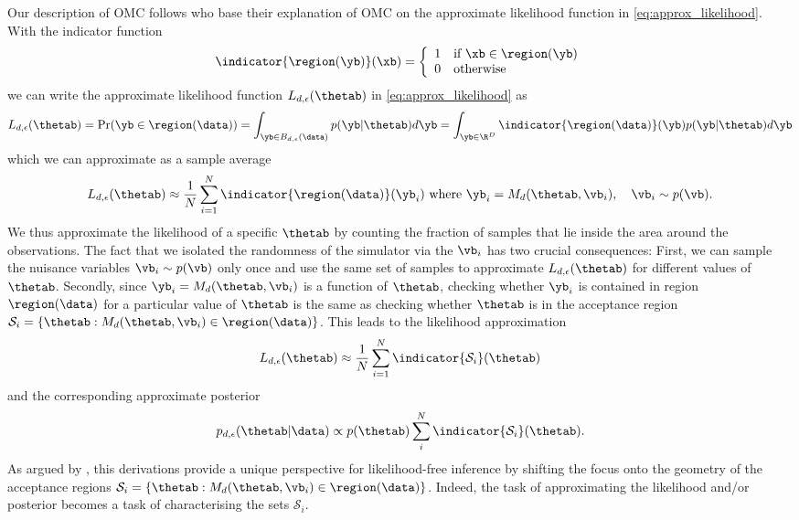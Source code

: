 Our description of OMC \citep{Meeds2015}
follows \citet{Ikonomov2019} who base their explanation of OMC on the
approximate likelihood function in \eqref{eq:approx_likelihood}. With
the indicator function
%
\begin{equation} \label{eq:indicator} \indicator{\region(\yb)}(\xb)=
  \left\{
    \begin{array}{ll}
      1 & \mbox{if } \xb \in \region(\yb) \\
      0 & \mbox{otherwise} 
    \end{array} \right. \end{equation}
%
we can write the approximate likelihood function $L_{d, \epsilon}(\thetab)$ in \eqref{eq:approx_likelihood} as
\begin{gather} \label{eq:approx_likelihood_omc}
  L_{d, \epsilon}(\thetab) = \Pr(\yb \in \region(\data)) =
  \int_{\yb \in B_{d,\epsilon}(\data)}p(\yb|\thetab)d\yb =
  \int_{\yb \in \R^D} \indicator{\region(\data)}(\yb)p(\yb|\thetab)d\yb
\end{gather}
which we can approximate as a sample average
\begin{equation}
L_{d, \epsilon}(\thetab) \approx \frac{1}{N} \sum_{i=1}^N \indicator{\region (\data)} (\yb_i)
  \text{ where } \yb_i = M_d(\thetab, \vb_i), \quad \vb_i \sim p(\vb). \label{eq:alt_view}
\end{equation}
We thus approximate the likelihood of a specific $\thetab$ by counting
the fraction of samples that lie inside the area around the
observations. The fact that we isolated the randomness of the
simulator via the $\vb_i$ has two crucial consequences: First, we can
sample the nuisance variables $\vb_i \sim p(\vb)$ only once and use
the same set of samples to approximate $L_{d,\epsilon}(\thetab)$ for
different values of $\thetab$. Secondly, since
$\yb_i=M_d(\thetab, \vb_i)$ is a function of $\thetab$, checking
whether $\yb_i$ is contained in region $\region (\data)$ for a
particular value of $\thetab$ is the same as checking whether
$\thetab$ is in the acceptance region $\mathcal{S}_i = \{ \thetab:
M_d(\thetab, \vb_i) \in \region(\data) \}$. This leads to the
likelihood approximation
\begin{equation}
L_{d, \epsilon}(\thetab) \approx \frac{1}{N} \sum_{i=1}^N \indicator{\mathcal{S}_i}(\thetab) \label{eq:alt_view_theta}
\end{equation}
and the corresponding approximate posterior
\begin{equation} \label{eq:approx_posterior_omc}
  p_{d,\epsilon}(\thetab|\data) \propto
  p(\thetab) \sum_i^N  \indicator{\mathcal{S}_i}(\thetab).
\end{equation}
As argued by \citet{Ikonomov2019}, this derivations provide a unique
perspective for likelihood-free inference by shifting the focus onto
the geometry of the acceptance regions $\mathcal{S}_i = \{ \thetab:
M_d(\thetab, \vb_i) \in \region(\data)\}$. Indeed, the task of
approximating the likelihood and/or posterior becomes a task of
characterising the sets $\mathcal{S}_i$.

